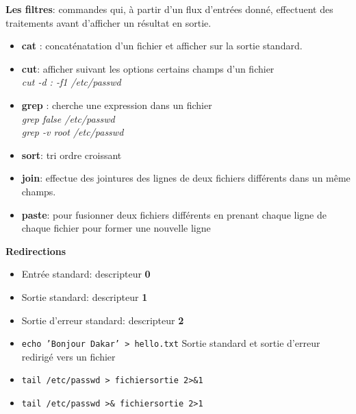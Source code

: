 \documentclass[french]{beamer}
\begin{document}
\begin{frame}
\textbf{Les filtres}: commandes qui, à partir d'un flux d'entrées donné,
effectuent des traitements avant d'afficher un résultat en sortie.
    \begin{itemize}
    \item \textbf{cat} : concaténatation d'un fichier et afficher sur la sortie
    standard. \\
    \item \textbf{cut}: afficher suivant les options certains champs d'un
    fichier \\
    \textit{cut -d : -f1 /etc/passwd}
    \item \textbf{grep} : cherche une expression dans un fichier \\
    \textit{grep false /etc/passwd} \\
    \textit{grep -v root /etc/passwd} \\
    \item \textbf{sort}: tri ordre croissant
    \item \textbf{join}: effectue des jointures des lignes de deux fichiers
    différents dans un même champs. 
    \item \textbf{paste}: pour fusionner deux fichiers différents en prenant
    chaque ligne de chaque fichier pour former une nouvelle ligne
    \end{itemize}
\end{frame}


\begin{frame}
\textbf{Redirections} \\
    \begin{itemize}
    \item Entrée standard: descripteur \textbf{0}
    \item Sortie standard: descripteur \textbf{1}
    \item Sortie d'erreur standard: descripteur \textbf{2}
    \item \texttt{echo 'Bonjour Dakar' > hello.txt}
    Sortie standard et sortie d'erreur redirigé vers un fichier
    \item \texttt{tail /etc/passwd > fichiersortie 2>\&1 }
    \item \texttt{tail /etc/passwd >\& fichiersortie 2>1 }
    \end{itemize}
\end{frame}
\end{document}
